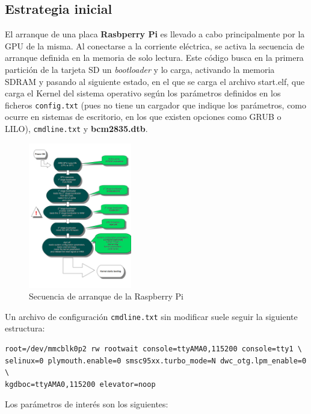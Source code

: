 \documentclass{article}
\begin{document}
\subsection{Estrategia inicial}

El arranque de una placa \textbf{Rasbperry Pi} es llevado a cabo principalmente por la GPU de la misma. Al conectarse a la corriente eléctrica, se activa la secuencia de arranque definida en la memoria de solo lectura. Este código busca en la primera partición de la tarjeta SD un \textit{bootloader} y lo carga, activando la memoria SDRAM y pasando al siguiente estado, en el que se carga el archivo start.elf, que carga el Kernel del sistema operativo según los parámetros definidos en los ficheros \texttt{config.txt} (pues no tiene un cargador que indique los parámetros, como ocurre en sistemas de escritorio, en los que existen opciones como GRUB o LILO), \texttt{cmdline.txt} y \textbf{bcm2835.dtb}.

\begin{figure}[H]
	\centering
	\includegraphics[width=0.4\textwidth]{bootsequence}
	\caption{Secuencia de arranque de la Raspberry Pi\cite{bootsequence}}
	\label{bootsequence}
\end{figure}

Un archivo de configuración \texttt{cmdline.txt} sin modificar suele seguir la siguiente estructura:

\begin{lstlisting}[frame=single,basicstyle=\small\ttfamily]
root=/dev/mmcblk0p2 rw rootwait console=ttyAMA0,115200 console=tty1 \
selinux=0 plymouth.enable=0 smsc95xx.turbo_mode=N dwc_otg.lpm_enable=0 \
kgdboc=ttyAMA0,115200 elevator=noop
\end{lstlisting}

Los parámetros de interés son los siguientes:
\end{document}

